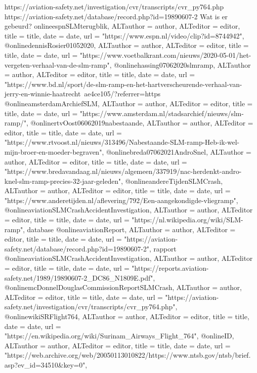 https://aviation-safety.net/investigation/cvr/transcripts/cvr_py764.php 
https://aviation-safety.net/database/record.php?id=19890607-2 
Wat is er gebeurd?
online{espnSLMterugblik,	ALTauthor = {author},	ALTeditor = {editor},	title = {title},	date = {date},	url = {"https://www.espn.nl/video/clip?id=8744942"},}
@online{dennisRosier01052020,	ALTauthor = {author},	ALTeditor = {editor},	title = {title},	date = {date},	url = {"https://www.voetbalkrant.com/nieuws/2020-05-01/het-vergeten-verhaal-van-de-slm-ramp"},}
@online{hassing07062020slmramp,	ALTauthor = {author},	ALTeditor = {editor},	title = {title},	date = {date},	url = {"https://www.bd.nl/sport/de-slm-ramp-en-het-hartverscheurende-verhaal-van-jerry-en-winnie-haatrecht~ae4ce105/?referrer=https%
@online{amsterdamArchiefSLM,	ALTauthor = {author},	ALTeditor = {editor},	title = {title},	date = {date},	url = {"https://www.amsterdam.nl/stadsarchief/nieuws/slm-ramp/"},}
@online{rtvOost06062019nabestaande,	ALTauthor = {author},	ALTeditor = {editor},	title = {title},	date = {date},	url = {"https://www.rtvoost.nl/nieuws/313496/Nabestaande-SLM-ramp-Heb-ik-wel-mijn-broer-en-moeder-begraven"},}
@online{breda07062021AndroSnel,	ALTauthor = {author},	ALTeditor = {editor},	title = {title},	date = {date},	url = {"https://www.bredavandaag.nl/nieuws/algemeen/337919/nac-herdenkt-andro-knel-slm-ramp-precies-32-jaar-geleden"},}
@online{andereTijdenSLMCrash,	ALTauthor = {author},	ALTeditor = {editor},	title = {title},	date = {date},	url = {"https://www.anderetijden.nl/aflevering/792/Een-aangekondigde-vliegramp"},}
@online{aviationSLMCrashAccidentInvestigation,	ALTauthor = {author},	ALTeditor = {editor},	title = {title},	date = {date},	url = {"https://nl.wikipedia.org/wiki/SLM-ramp"},}
database
@online{aviationReport,	ALTauthor = {author},	ALTeditor = {editor},	title = {title},	date = {date},	url = {"https://aviation-safety.net/database/record.php?id=19890607-2"},}
rapport
@online{aviationSLMCrashAccidentInvestigation,	ALTauthor = {author},	ALTeditor = {editor},	title = {title},	date = {date},	url = {"https://reports.aviation-safety.net/1989/19890607-2_DC86_N1809E.pdf"},}
@online{mcDonnelDouglasCommissionReportSLMCrash,	ALTauthor = {author},	ALTeditor = {editor},	title = {title},	date = {date},	url = {"https://aviation-safety.net/investigation/cvr/transcripts/cvr_py764.php"},}
@online{wikiSRFlight764,	ALTauthor = {author},	ALTeditor = {editor},	title = {title},	date = {date},	url = {"https://en.wikipedia.org/wiki/Surinam_Airways_Flight_764"},}
@online{ID,	ALTauthor = {author},	ALTeditor = {editor},	title = {title},	date = {date},	url = {"https://web.archive.org/web/20050113010822/https://www.ntsb.gov/ntsb/brief.asp?ev_id=34510&key=0"},}
}}
